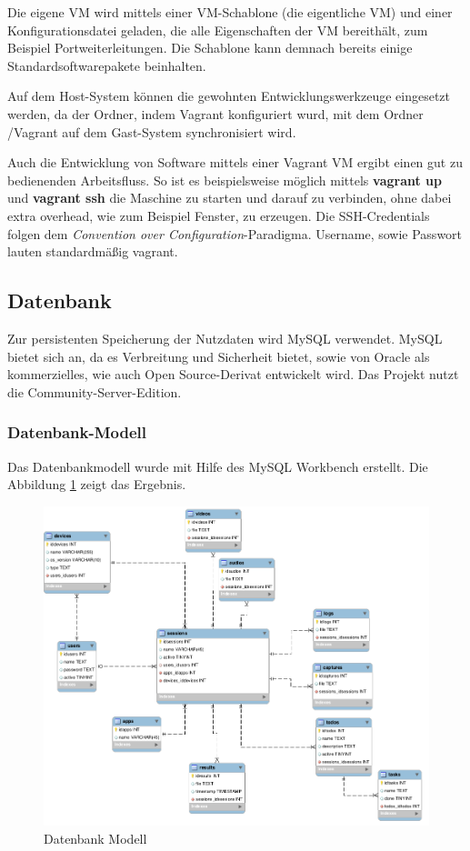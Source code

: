 Die eigene VM wird mittels einer VM-Schablone (die eigentliche VM) und einer Konfigurationsdatei geladen, die alle Eigenschaften der VM bereithält, zum Beispiel Portweiterleitungen. Die Schablone kann demnach bereits einige Standardsoftwarepakete beinhalten. 

Auf dem Host-System können die gewohnten Entwicklungswerkzeuge eingesetzt werden, da der Ordner, indem Vagrant konfiguriert wurd, mit dem Ordner /Vagrant auf dem Gast-System synchronisiert wird. 

Auch die Entwicklung von Software mittels einer Vagrant VM ergibt einen gut zu bedienenden Arbeitsfluss. So ist es beispielsweise möglich mittels \textbf{vagrant up} und \textbf{vagrant ssh} die Maschine zu starten und darauf zu verbinden, ohne dabei extra overhead, wie zum Beispiel Fenster, zu erzeugen. Die SSH-Credentials folgen dem \textit{Convention over Configuration}-Paradigma. Username, sowie Passwort lauten standardmäßig vagrant. 


\subsection{Datenbank}

Zur persistenten Speicherung der Nutzdaten wird MySQL verwendet. MySQL bietet sich an, da es Verbreitung und Sicherheit bietet, sowie von Oracle als kommerzielles, wie auch Open Source-Derivat entwickelt wird. Das Projekt nutzt die Community-Server-Edition. 

\subsubsection{Datenbank-Modell}
Das Datenbankmodell wurde mit Hilfe des MySQL Workbench erstellt. Die Abbildung \ref{figure-db-model} zeigt das Ergebnis.
\begin{figure}[h!]
	\centering
	\includegraphics[width=\linewidth,keepaspectratio]{img/db_model.png}
	\caption{Datenbank Modell}
	\label{figure-db-model}
\end{figure}


